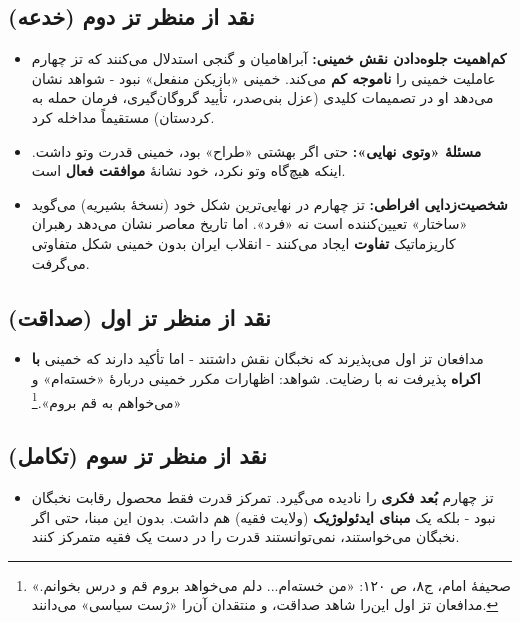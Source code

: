 \documentclass[12pt,a4paper]{book}
\newcommand{\keyword}[1]{\textbf{\textcolor{cPrimary}{#1}}}
\begin{document}
\subsection{نقد از منظر تز دوم (خدعه)}

\begin{itemize}[label=\textcolor{cAccent}{$\times$}, rightmargin=2em]
    \item \textbf{کم‌اهمیت جلوه‌دادن نقش خمینی:} آبراهامیان و گنجی استدلال می‌کنند که تز چهارم عاملیت خمینی را \keyword{ناموجه کم} می‌کند. خمینی «بازیکن منفعل» نبود - شواهد نشان می‌دهد او در تصمیمات کلیدی (عزل بنی‌صدر، تأیید گروگان‌گیری، فرمان حمله به کردستان) مستقیماً مداخله کرد.
    
    \item \textbf{مسئلهٔ «وتوی نهایی»:} حتی اگر بهشتی «طراح» بود، خمینی قدرت وتو داشت. اینکه هیچ‌گاه وتو نکرد، خود نشانهٔ \keyword{موافقت فعال} است.
    
    \item \textbf{شخصیت‌زدایی افراطی:} تز چهارم در نهایی‌ترین شکل خود (نسخهٔ بشیریه) می‌گوید «ساختار» تعیین‌کننده است نه «فرد». اما تاریخ معاصر نشان می‌دهد رهبران کاریزماتیک \keyword{تفاوت} ایجاد می‌کنند - انقلاب ایران بدون خمینی شکل متفاوتی می‌گرفت.
\end{itemize}

\subsection{نقد از منظر تز اول (صداقت)}

\begin{itemize}[label=\textcolor{cGreen}{$\times$}, rightmargin=2em]
    \item مدافعان تز اول می‌پذیرند که نخبگان نقش داشتند - اما تأکید دارند که خمینی \keyword{با اکراه} پذیرفت نه با رضایت. شواهد: اظهارات مکرر خمینی دربارهٔ «خسته‌ام» و «می‌خواهم به قم بروم».\footnote{صحیفهٔ امام، ج۸، ص ۱۲۰: «من خسته‌ام... دلم می‌خواهد بروم قم و درس بخوانم.» مدافعان تز اول این‌را شاهد صداقت، و منتقدان آن‌را «ژست سیاسی» می‌دانند.}
\end{itemize}

\subsection{نقد از منظر تز سوم (تکامل)}

\begin{itemize}[label=\textcolor{cGold}{$\times$}, rightmargin=2em]
    \item تز چهارم \keyword{بُعد فکری} را نادیده می‌گیرد. تمرکز قدرت فقط محصول رقابت نخبگان نبود - بلکه یک \keyword{مبنای ایدئولوژیک} (ولایت فقیه) هم داشت. بدون این مبنا، حتی اگر نخبگان می‌خواستند، نمی‌توانستند قدرت را در دست یک فقیه متمرکز کنند.
\end{itemize}
\end{document}
